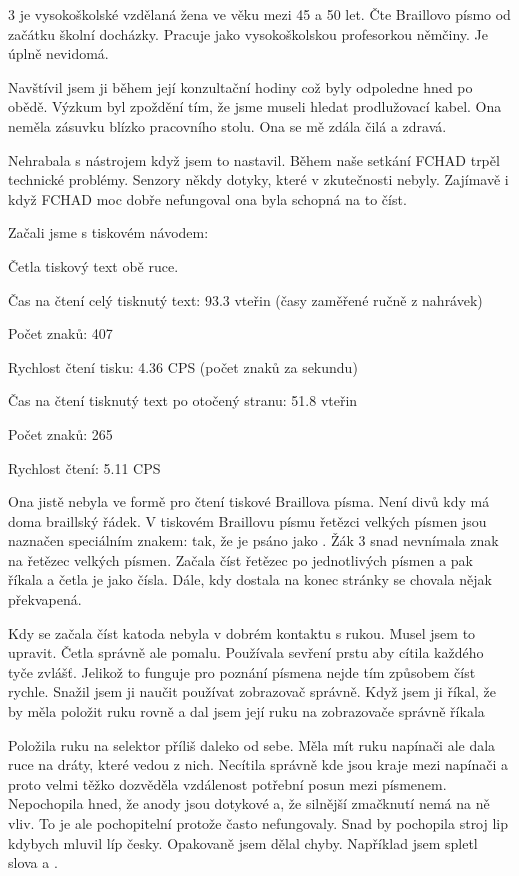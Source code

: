  3 je vysokoškolské vzdělaná žena ve věku mezi 45 a 50 let. Čte Braillovo písmo od začátku školní docházky.  Pracuje jako vysokoškolskou profesorkou němčiny.  Je úplně nevidomá.

Navštívil jsem ji během její konzultační hodiny což byly odpoledne hned po obědě.  Výzkum byl zpoždění tím, že jsme museli hledat prodlužovací kabel. Ona neměla zásuvku blízko pracovního stolu.  Ona se mě zdála čilá a zdravá.

Nehrabala s nástrojem když jsem to nastavil. Během naše setkání FCHAD trpěl technické problémy. Senzory někdy  dotyky, které v zkutečnosti nebyly.  Zajímavě i když FCHAD moc dobře nefungoval ona byla schopná na to číst.

Začali jsme s tiskovém návodem:

Četla tiskový text obě ruce.

Čas na čtení celý tisknutý text: 93.3 vteřin (časy zaměřené ručně z nahrávek)

Počet znaků: 407

Rychlost čtení tisku: 4.36 CPS (počet znaků za sekundu)

Čas na čtení tisknutý text po otočený stranu: 51.8 vteřin

Počet znaků: 265

Rychlost čtení: 5.11 CPS

Ona jistě nebyla ve formě pro čtení tiskové Braillova písma.  Není divů kdy má doma braillský řádek.  V tiskovém Braillovu písmu řetězci velkých písmen jsou naznačen speciálním znakem:  tak, že  je psáno jako . Žák 3 snad nevnímala znak na řetězec velkých písmen.  Začala číst řetězec po jednotlivých písmen a pak říkala  a četla je jako čísla.  Dále, kdy dostala na konec stránky se chovala nějak překvapená.

Kdy se začala číst katoda nebyla v dobrém kontaktu s rukou.  Musel jsem to upravit.  Četla správně ale pomalu. Používala sevření prstu aby cítila každého tyče zvlášť.  Jelikož to funguje pro poznání písmena nejde tím způsobem číst rychle. Snažil jsem ji naučit používat zobrazovač správně.  Když jsem ji říkal, že by měla položit ruku rovně a dal jsem její ruku na zobrazovače správně říkala  %

Položila ruku na selektor příliš daleko od sebe. Měla mít ruku napínači ale dala ruce na dráty, které vedou z nich.  Necítila správně kde jsou kraje mezi napínači a proto velmi těžko dozvěděla vzdálenost potřební posun mezi písmenem.  Nepochopila hned, že anody jsou dotykové a, že silnější zmačknutí nemá na ně vliv.  To je ale pochopitelní protože často nefungovaly. Snad by pochopila stroj lip kdybych mluvil líp česky.  Opakovaně jsem dělal chyby. Například jsem spletl slova  a .

